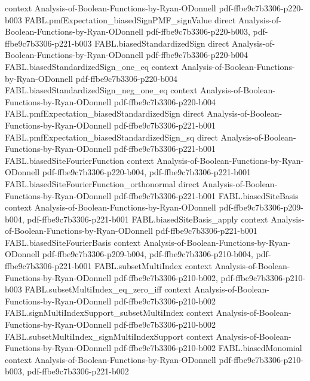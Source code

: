 \begin{theorem}
  {context}
  {Analysis-of-Boolean-Functions-by-Ryan-ODonnell}
  {pdf-ffbe9c7b3306-p220-b003}
\proofstep
  {FABL.pmfExpectation_biasedSignPMF_signValue}
  {direct}
  {Analysis-of-Boolean-Functions-by-Ryan-ODonnell}
  {pdf-ffbe9c7b3306-p220-b003,
    pdf-ffbe9c7b3306-p221-b003}
\proofstep
  {FABL.biasedStandardizedSign}
  {direct}
  {Analysis-of-Boolean-Functions-by-Ryan-ODonnell}
  {pdf-ffbe9c7b3306-p220-b004}
\proofstep
  {FABL.biasedStandardizedSign_one_eq}
  {context}
  {Analysis-of-Boolean-Functions-by-Ryan-ODonnell}
  {pdf-ffbe9c7b3306-p220-b004}
\proofstep
  {FABL.biasedStandardizedSign_neg_one_eq}
  {context}
  {Analysis-of-Boolean-Functions-by-Ryan-ODonnell}
  {pdf-ffbe9c7b3306-p220-b004}
\proofstep
  {FABL.pmfExpectation_biasedStandardizedSign}
  {direct}
  {Analysis-of-Boolean-Functions-by-Ryan-ODonnell}
  {pdf-ffbe9c7b3306-p221-b001}
\proofstep
  {FABL.pmfExpectation_biasedStandardizedSign_sq}
  {direct}
  {Analysis-of-Boolean-Functions-by-Ryan-ODonnell}
  {pdf-ffbe9c7b3306-p221-b001}
\proofstep
  {FABL.biasedSiteFourierFunction}
  {context}
  {Analysis-of-Boolean-Functions-by-Ryan-ODonnell}
  {pdf-ffbe9c7b3306-p220-b004,
    pdf-ffbe9c7b3306-p221-b001}
\proofstep
  {FABL.biasedSiteFourierFunction_orthonormal}
  {direct}
  {Analysis-of-Boolean-Functions-by-Ryan-ODonnell}
  {pdf-ffbe9c7b3306-p221-b001}
\proofstep
  {FABL.biasedSiteBasis}
  {context}
  {Analysis-of-Boolean-Functions-by-Ryan-ODonnell}
  {pdf-ffbe9c7b3306-p209-b004,
    pdf-ffbe9c7b3306-p221-b001}
\proofstep
  {FABL.biasedSiteBasis_apply}
  {context}
  {Analysis-of-Boolean-Functions-by-Ryan-ODonnell}
  {pdf-ffbe9c7b3306-p221-b001}
\proofstep
  {FABL.biasedSiteFourierBasis}
  {context}
  {Analysis-of-Boolean-Functions-by-Ryan-ODonnell}
  {pdf-ffbe9c7b3306-p209-b004,
    pdf-ffbe9c7b3306-p210-b004,
    pdf-ffbe9c7b3306-p221-b001}
\proofstep
  {FABL.subsetMultiIndex}
  {context}
  {Analysis-of-Boolean-Functions-by-Ryan-ODonnell}
  {pdf-ffbe9c7b3306-p210-b002,
    pdf-ffbe9c7b3306-p210-b003}
\proofstep
  {FABL.subsetMultiIndex_eq_zero_iff}
  {context}
  {Analysis-of-Boolean-Functions-by-Ryan-ODonnell}
  {pdf-ffbe9c7b3306-p210-b002}
\proofstep
  {FABL.signMultiIndexSupport_subsetMultiIndex}
  {context}
  {Analysis-of-Boolean-Functions-by-Ryan-ODonnell}
  {pdf-ffbe9c7b3306-p210-b002}
\proofstep
  {FABL.subsetMultiIndex_signMultiIndexSupport}
  {context}
  {Analysis-of-Boolean-Functions-by-Ryan-ODonnell}
  {pdf-ffbe9c7b3306-p210-b002}
\proofstep
  {FABL.biasedMonomial}
  {context}
  {Analysis-of-Boolean-Functions-by-Ryan-ODonnell}
  {pdf-ffbe9c7b3306-p210-b003,
    pdf-ffbe9c7b3306-p221-b002}

\end{theorem}
